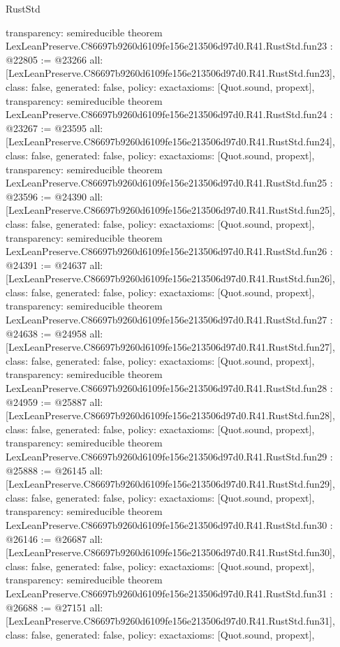 \begin{lexlean}{RustStd}
\begin{coremodule}
{  transparency: semireducible
}
theorem LexLeanPreserve.C86697b9260d6109fe156e213506d97d0.R41.RustStd.fun23 : @22805 := @23266 {
  all: [LexLeanPreserve.C86697b9260d6109fe156e213506d97d0.R41.RustStd.fun23],
  class: false,
  generated: false,
  policy: exact{axioms: [Quot.sound, propext]},
  transparency: semireducible
}
theorem LexLeanPreserve.C86697b9260d6109fe156e213506d97d0.R41.RustStd.fun24 : @23267 := @23595 {
  all: [LexLeanPreserve.C86697b9260d6109fe156e213506d97d0.R41.RustStd.fun24],
  class: false,
  generated: false,
  policy: exact{axioms: [Quot.sound, propext]},
  transparency: semireducible
}
theorem LexLeanPreserve.C86697b9260d6109fe156e213506d97d0.R41.RustStd.fun25 : @23596 := @24390 {
  all: [LexLeanPreserve.C86697b9260d6109fe156e213506d97d0.R41.RustStd.fun25],
  class: false,
  generated: false,
  policy: exact{axioms: [Quot.sound, propext]},
  transparency: semireducible
}
theorem LexLeanPreserve.C86697b9260d6109fe156e213506d97d0.R41.RustStd.fun26 : @24391 := @24637 {
  all: [LexLeanPreserve.C86697b9260d6109fe156e213506d97d0.R41.RustStd.fun26],
  class: false,
  generated: false,
  policy: exact{axioms: [Quot.sound, propext]},
  transparency: semireducible
}
theorem LexLeanPreserve.C86697b9260d6109fe156e213506d97d0.R41.RustStd.fun27 : @24638 := @24958 {
  all: [LexLeanPreserve.C86697b9260d6109fe156e213506d97d0.R41.RustStd.fun27],
  class: false,
  generated: false,
  policy: exact{axioms: [Quot.sound, propext]},
  transparency: semireducible
}
theorem LexLeanPreserve.C86697b9260d6109fe156e213506d97d0.R41.RustStd.fun28 : @24959 := @25887 {
  all: [LexLeanPreserve.C86697b9260d6109fe156e213506d97d0.R41.RustStd.fun28],
  class: false,
  generated: false,
  policy: exact{axioms: [Quot.sound, propext]},
  transparency: semireducible
}
theorem LexLeanPreserve.C86697b9260d6109fe156e213506d97d0.R41.RustStd.fun29 : @25888 := @26145 {
  all: [LexLeanPreserve.C86697b9260d6109fe156e213506d97d0.R41.RustStd.fun29],
  class: false,
  generated: false,
  policy: exact{axioms: [Quot.sound, propext]},
  transparency: semireducible
}
theorem LexLeanPreserve.C86697b9260d6109fe156e213506d97d0.R41.RustStd.fun30 : @26146 := @26687 {
  all: [LexLeanPreserve.C86697b9260d6109fe156e213506d97d0.R41.RustStd.fun30],
  class: false,
  generated: false,
  policy: exact{axioms: [Quot.sound, propext]},
  transparency: semireducible
}
theorem LexLeanPreserve.C86697b9260d6109fe156e213506d97d0.R41.RustStd.fun31 : @26688 := @27151 {
  all: [LexLeanPreserve.C86697b9260d6109fe156e213506d97d0.R41.RustStd.fun31],
  class: false,
  generated: false,
  policy: exact{axioms: [Quot.sound, propext]},
}
\end{coremodule}
\end{lexlean}

